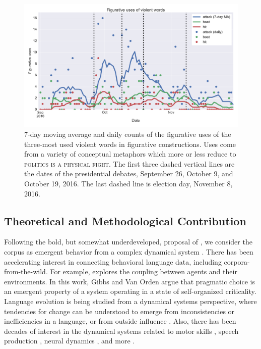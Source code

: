 \begin{figure}
\begin{center}
  \hspace*{-.25in}
  \includegraphics[width=\textwidth]{figures/fig_uses_violent_words-FIG1.pdf}
\end{center}
\caption{
  7-day moving average and daily counts of the figurative uses of the three-most
  used violent words in figurative constructions. Uses come from a variety of
  conceptual metaphors which more or less reduce to 
  \textsc{politics is a physical fight}. The first three dashed 
  vertical lines are the dates of the presidential debates, 
  September 26, October 9, and October 19, 2016. The last dashed
  line is election day, November 8, 2016.
}
\label{fig:timeseries}
\end{figure}

\subsection{Theoretical and Methodological Contribution}
\label{sub:Theoretical-and-Methodological-Contribution}

Following the bold, but somewhat underdeveloped, proposal of ,
we consider the corpus as emergent behavior from a complex dynamical system \cite{Beer2000}.
There has been accelerating interest in connecting behavioral language data,
including corpora-from-the-wild. For example,  explores 
the coupling between agents and their environments. 
In this work, Gibbs and Van Orden argue that pragmatic choice is an
emergent property of a system operating in a state of self-organized 
criticality. Language evolution is being studied from a dynamical systems perspective, 
where tendencies for change
can be understood to emerge from inconsistencies or inefficiencies in a 
language, or from outside influence \cite{Dale2016}. Also, there has been decades of interest
in the dynamical systems related to motor skills \cite{Haken1985}, speech 
production \cite{Kelso1986}, neural dynamics \cite{Chialvo2010}, and more
\cite{Spivey2007}. 

